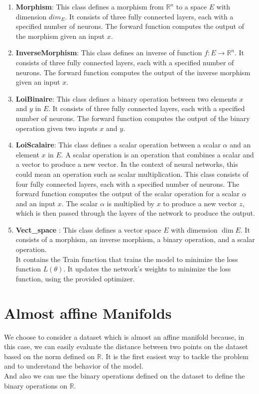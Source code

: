 \documentclass{report}
\begin{document}
    \begin{enumerate}
        \item \textbf{Morphism}: This class defines a morphism from 
        $\mathbb{R}^n$ to a space $E$ with dimension $dim_E$. 
        It consists of three fully connected layers, each with 
        a specified number of neurons. The forward function computes 
        the output of the morphism given an input $x$.
        \item \textbf{InverseMorphism}: This class defines an inverse
        of function $f: E \rightarrow \mathbb{R}^n$. It consists of
        three fully connected layers, each with a specified number
        of neurons. The forward function computes the output of the
        inverse morphism given an input $x$.
        \item \textbf{LoiBinaire}: This class defines a binary operation 
        between two elements $x$ and $y$ in $E$. It consists of three 
        fully connected layers, each with a specified number of neurons. 
        The forward function computes the output of the binary operation 
        given two inputs $x$ and $y$.
        \item \textbf{LoiScalaire}: 
        This class defines a scalar operation between a scalar $\alpha$ and an element $x$ in $E$. A scalar operation is an operation that combines a scalar and a vector to produce a new vector. In the context of neural networks, this could mean an operation such as scalar multiplication. This class consists of four fully connected layers, each with a specified number of neurons. The forward function computes the output of the scalar operation for a scalar $\alpha$ and an input $x$. The scalar $\alpha$ is multiplied by $x$ to produce a new vector $z$, which is then passed through the layers of the network to produce the output.
        \item \textbf{Vect\_space} : This class defines a vector space $E$ with dimension $\dim{E}$. It consists of a morphism, an inverse morphism, a binary operation, and a scalar operation. 
        \\ 
        It contains the Train function that trains the model to minimize the loss function $L(\theta)$. It updates the network's weights to minimize the loss function, using the provided optimizer. 
    \end{enumerate}


\section{Almost affine Manifolds}
    We choose to consider a dataset  which is almost an affine manifold because, in this case, we can easily evaluate the distance between two points on the dataset based on the norm defined on $\mathbb{R}$. It is the first easiest way to tackle the problem and to understand the behavior of the model.\\
    And also we can use the binary operations defined on the dataset to define the binary operations on $\mathbb{R}$.
\end{document}
